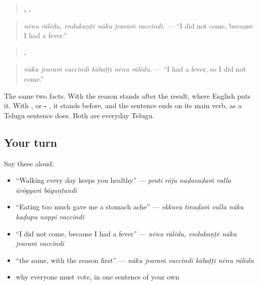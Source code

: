 \begin{grammarlens}[title={Grammar Lens: two places for a reason}]
\begin{quote}
\textbf{ ,    .}
\end{quote}

\begin{quote}
\emph{nēnu rālēdu, endukaṇṭē nāku jvaraṁ vaccindi.} — \textquotedblleft{}I did not come, because I had a fever.\textquotedblright{}
\end{quote}

\begin{quote}
\textbf{     .}
\end{quote}

\begin{quote}
\emph{nāku jvaraṁ vaccindi kābaṭṭi nēnu rālēdu.} — \textquotedblleft{}I had a fever, so I did not come.\textquotedblright{}
\end{quote}

The same two facts. With \textbf{} the reason stands after the result, where English puts it. With \textbf{}, or \textbf{- }, it stands before, and the sentence ends on its main verb, as a Telugu sentence does. Both are everyday Telugu.
\end{grammarlens}

\subsection*{Your turn}
Say these aloud:

\begin{itemize}
\raggedright
  \item \textquotedblleft{}Walking every day keeps you healthy\textquotedblright{} — \emph{prati rōju naḍavaḍaṁ valla ārōgyaṁ bāguṇṭundi}
  \item \textquotedblleft{}Eating too much gave me a stomach ache\textquotedblright{} — \emph{ekkuva tinaḍaṁ valla nāku kaḍupu noppi vaccindi}
  \item \textquotedblleft{}I did not come, because I had a fever\textquotedblright{} — \emph{nēnu rālēdu, endukaṇṭē nāku jvaraṁ vaccindi}
  \item \textquotedblleft{}the same, with the reason first\textquotedblright{} — \emph{nāku jvaraṁ vaccindi kābaṭṭi nēnu rālēdu}
  \item why everyone must vote, in one sentence of your own
\end{itemize}

